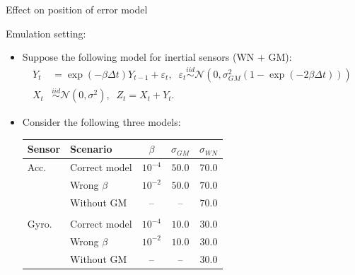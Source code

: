 \documentclass[envcountsect,usenames,dvipsnames]{beamer}
\theoremstyle{mystyle}
\begin{document}
\begin{frame}{Effect on position of error model}
	\begin{exampleblock}{Emulation setting:}
		\begin{itemize}
			\item Suppose the following model for inertial sensors (WN + GM):
			\small
			\begin{equation*}
				\begin{aligned}
					{Y_t} &= {\exp(-\beta \Delta t ) Y_{t-1} + \varepsilon_t,} \;\; { \varepsilon_t \stackrel{iid}{\sim} \mathcal{N}(0,\sigma_{GM}^2 (1 - \exp(-2 \beta \Delta t)))}\\
					{ X_t} & {\stackrel{iid}{\sim} \mathcal{N}(0,\sigma^2),} \;\; 
					{Z_t = X_t + Y_t.}
				\end{aligned}
			\end{equation*}
			\normalsize
			\item Consider the following three models:
			
			\begin{table}
			    \centering
			    \small{
			    \setlength{\tabcolsep}{8pt}
			    \begin{tabular*}{0.8\textwidth }{l l c c c }
			    \toprule
			    \textbf{Sensor}     & \textbf{Scenario}     & $\beta$  & $\sigma_{GM}$     & $\sigma_{WN}$  \\
			    \midrule
			    Acc. & {\color{beamer@myorange}Correct model} & $10^{-4}$ & $50.0$ & $70.0$     \\
			    & {\color{beamer@UIUCblue}Wrong $\beta$} & $10^{-2}$ & $50.0$ & $70.0$     \\
			    & {\color{beamer@UIUCblue}Without GM} & -- & -- & $70.0$     \\[1mm]
			    \hdashline\\[-3mm]
			    Gyro. & {\color{beamer@myorange}Correct model} & $10^{-4}$ & $10.0$ & $30.0$ \\
			    & {\color{beamer@UIUCblue}Wrong $\beta$} & $10^{-2}$ & $10.0$ & $30.0$ \\
			    & {\color{beamer@UIUCblue}Without GM} & -- & -- & $30.0$ \\
			    \bottomrule
			    \end{tabular*}
			}
			\end{table}
			\vspace{-0.2cm}
		\end{itemize}
	\end{exampleblock}  
	
\end{frame}
\end{document}
